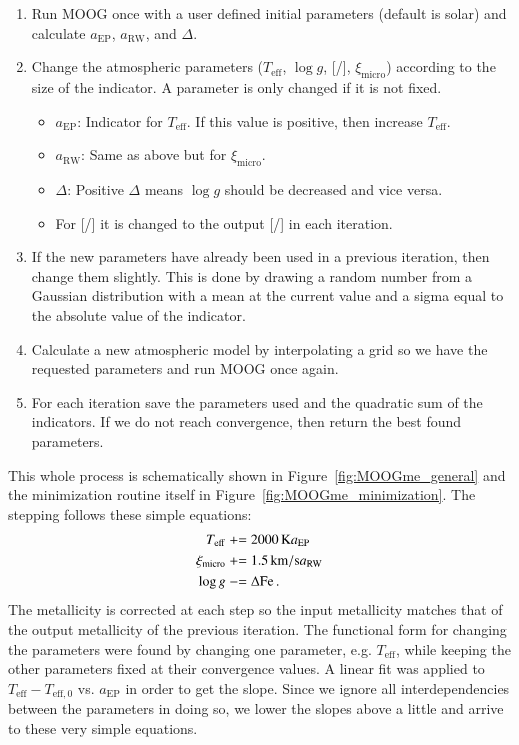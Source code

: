 \documentclass{aa}
\newcommand{\pluseq}{\mathrel{+}=}
\newcommand{\minuseq}{\mathrel{-}=}
\begin{document}
\begin{enumerate}
    \item Run MOOG once with a user defined initial parameters (default is
          solar) and calculate $a_\mathrm{EP}$, $a_\mathrm{RW}$, and
          $\Delta$.
    \item Change the atmospheric parameters ($T_\mathrm{eff}$, $\log g$,
          [/], $\xi_\mathrm{micro}$) according to the size of the
          indicator. A parameter is only changed if it is not fixed.
    \begin{itemize}
        \item $a_\mathrm{EP}$: Indicator for $T_\mathrm{eff}$. If this value
              is positive, then increase $T_\mathrm{eff}$.
        \item $a_\mathrm{RW}$: Same as above but for $\xi_\mathrm{micro}$.
        \item $\Delta$: Positive $\Delta$ means $\log g$
              should be decreased and vice versa.
        \item For [/] it is changed to the output [/]
              in each iteration.
    \end{itemize}
    \item If the new parameters have already been used in a previous iteration,
          then change them slightly. This is done by drawing a random number from
          a Gaussian distribution with a mean at the current value and a sigma
          equal to the absolute value of the indicator.
    \item Calculate a new atmospheric model by interpolating a grid so we have
          the requested parameters and run MOOG once again.
    \item For each iteration save the parameters used and the quadratic sum of
          the indicators. If we do not reach convergence, then return the best
          found parameters.
\end{enumerate}
This whole process is schematically shown in Figure~\ref{fig:MOOGme_general} and
the minimization routine itself in Figure~\ref{fig:MOOGme_minimization}. The
stepping follows these simple equations:
\begin{align}
    T_\mathrm{eff}     &\pluseq \SI{2000}{K} a_\mathrm{EP}   \\
    \xi_\mathrm{micro} &\pluseq \SI{1.5}{km/s} a_\mathrm{RW} \\
    \log g             &\minuseq \Delta\ion{Fe}.
\end{align}
The metallicity is corrected at each step so the input metallicity matches that
of the output metallicity of the previous iteration. The functional form for
changing the parameters were found by changing one parameter, e.g.
$T_\mathrm{eff}$, while keeping the other parameters fixed at their convergence
values. A linear fit was applied to $T_\mathrm{eff} - T_\mathrm{eff,0}$ vs.
$a_\mathrm{EP}$ in order to get the slope. Since we ignore all interdependencies
between the parameters in doing so, we lower the slopes above a little and
arrive to these very simple equations.
\end{document}
